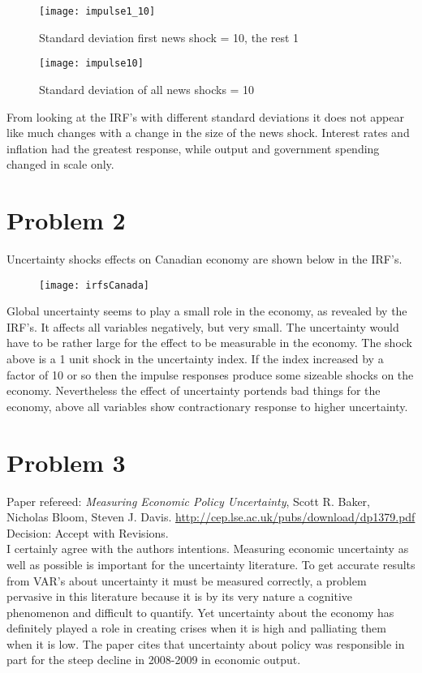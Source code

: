 \documentclass[]{article}
\begin{document}
\begin{figure}[H]
	\centering
	\texttt{[image: impulse1\_10]}
	\caption{Standard deviation first news shock = 10, the rest 1}
\end{figure}
\begin{figure}[H]
	\centering
	\texttt{[image: impulse10]}
	\caption{Standard deviation of all news shocks = 10}
\end{figure}

From looking at the IRF's with different standard deviations it does not appear like much changes with a change in the size of the news shock. Interest rates and inflation had the greatest response, while output and government spending changed in scale only. 

\section*{Problem 2}
Uncertainty shocks effects on Canadian economy are shown below in the IRF's. 
\begin{figure}[H]
	\centering
	\texttt{[image: irfsCanada]}
\end{figure}

Global uncertainty seems to play a small role in the economy, as revealed by the IRF's. It affects all variables negatively, but very small. The uncertainty would have to be rather large for the effect to be measurable in the economy. The shock above is a 1 unit shock in the uncertainty index. If the index increased by a factor of 10 or so then the impulse responses produce some sizeable shocks on the economy. Nevertheless the effect of uncertainty portends bad things for the economy, above all variables show contractionary response to higher uncertainty.

\section*{Problem 3}
Paper refereed: \textit{Measuring Economic Policy Uncertainty}, Scott R. Baker, Nicholas Bloom, Steven J. Davis. \url{http://cep.lse.ac.uk/pubs/download/dp1379.pdf} \\

Decision: Accept with Revisions. \\

I certainly agree with the authors intentions. Measuring economic uncertainty as well as possible is important for the uncertainty literature. To get accurate results from VAR's about uncertainty it must be measured correctly, a problem pervasive in this literature because it is by its very nature a cognitive phenomenon and difficult to quantify. Yet uncertainty about the economy has definitely played a role in creating crises when it is high and palliating them when it is low. The paper cites that uncertainty about policy was responsible in part for the steep decline in 2008-2009 in economic output. \\
\end{document}
